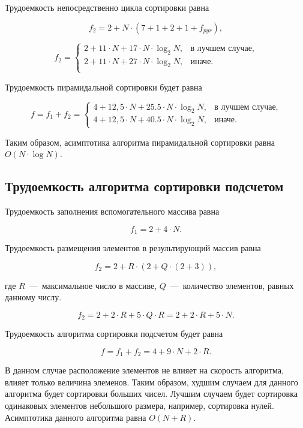 Трудоемкость непосредственно цикла сортировки равна

\begin{equation}
	f_2 = 2 + N \cdot (7 + 1 + 2 + 1 + f_{pyr}),
\end{equation}

\begin{equation}
	f_2 = \begin{cases}
		2 + 11 \cdot N + 17 \cdot N \cdot \log_2 N, & \text{в лучшем случае}, \\
		2 + 11 \cdot N + 27 \cdot N \cdot \log_2 N, & \text{иначе}. \\
	\end{cases}
\end{equation}

Трудоемкость пирамидальной сортировки будет равна

\begin{equation}
	f = f_1 + f_2 = \begin{cases}
 	4 + 12,5 \cdot N + 25.5 \cdot N \cdot \log_2 N, & \text{в лучшем случае}, \\
 	4 + 12,5 \cdot N + 40.5 \cdot N \cdot \log_2 N, & \text{иначе}.
 \end{cases}
\end{equation}

Таким образом, асимптотика алгоритма пирамидальной сортировки равна $O(N \cdot \log N)$.

\subsection{Трудоемкость алгоритма сортировки подсчетом}

Трудоемкость заполнения вспомогательного массива равна

\begin{equation}
	f_1 = 2 + 4 \cdot N.
\end{equation}

Трудоемкость размещения элементов в результирующий массив равна

\begin{equation}
	f_2 = 2 + R \cdot (2 + Q \cdot (2 + 3)),
\end{equation}

где $R$~---~максимальное число в массиве, $Q$~---~количество элементов, равных данному числу.

\begin{equation}
	f_2 = 2 + 2 \cdot R + 5 \cdot Q \cdot R = 2 + 2 \cdot R + 5 \cdot N.
\end{equation}

Трудоемкость алгоритма сортировки подсчетом будет равна

\begin{equation}
	f = f_1 + f_2 = 4 + 9 \cdot N + 2 \cdot R.
\end{equation}

В данном случае расположение элементов не влияет на скорость алгоритма, влияет только величина элеменов. Таким образом, худшим случаем для данного алгоритма будет сортировки больших чисел. Лучшим случаем будет сортировка одинаковых элементов небольшого размера, например, сортировка нулей. Асимптотика данного алгоритма равна $O(N + R)$.

\newpage